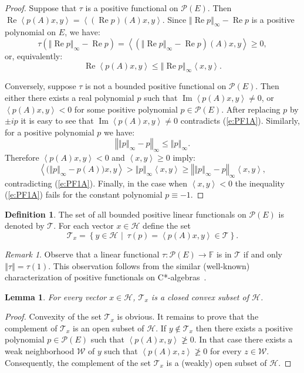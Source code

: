 \documentclass{tran-l}
\newtheorem{lem}[thm]{Lemma}
\theoremstyle{definition}
\newtheorem{defn}[thm]{Definition}
\theoremstyle{remark}
\newtheorem{rem}[thm]{Remark}
\numberwithin{equation}{subsection}
\DeclareMathOperator{\RE}{Re}
\DeclareMathOperator{\IM}{Im}
\newcommand{\h}{\mathcal{H}}
\newcommand{\W}{\mathcal{W}}
\newcommand{\Field}{\mathbb{F}}
\newcommand{\Poly}{\mathcal{P}(E)}
\newcommand{\States}{\mathcal{T}}
\newcommand{\set}[1]{\left\{#1\right\}}
\newcommand{\seq}[1]{\left<#1\right>}
\newcommand{\norm}[1]{\left\Vert#1\right\Vert}
\begin{document}
\begin{proof}
Suppose that $\tau$ is a positive functional on $\Poly$. Then $\RE \seq{p(A)x,y} = \seq{(\RE p)(A)x,y}$. Since $\norm{\RE p}_\infty - \RE p$ is a positive polynomial on $E$, we have:
\[ \tau(\norm{\RE p}_\infty - \RE p) =
   \seq{(\norm{\RE p}_\infty - \RE p)(A)x, y} \geq 0, \]
or, equivalently:
\[ \RE\seq{p(A)x,y} \leq \norm{\RE p}_\infty\seq{x,y}. \]

Conversely, suppose $\tau$ is not a bounded positive functional on $\Poly$. Then either there exists a real polynomial $p$ such that $\IM\seq{p(A)x,y}\neq0$, or $\seq{p(A)x,y}<0$ for some positive polynomial $p\in\Poly$. After replacing $p$ by $\pm{i}{p}$ it is easy to see that $\IM\seq{p(A)x,y}\neq0$ contradicts (\ref{e:PF1A}). Similarly, for a positive polynomial $p$ we have:
\[ \norm{\norm{p}_\infty-p}_\infty \leq \norm{p}_\infty. \]
Therefore $\seq{p(A)x,y}<0$ and $\seq{x,y}\geq0$ imply:
\[ \seq{ \big(\norm{p}_\infty-p(A)\big)x,y} > \norm{p}_\infty\seq{x,y}
   \geq \norm{\norm{p}_\infty-p}_\infty\seq{x,y}, \]
contradicting (\ref{e:PF1A}). Finally, in the case when $\seq{x,y}<0$ the inequality (\ref{e:PF1A}) fails for the constant polynomial $p\equiv-1$.
\end{proof}

\begin{defn}
The set of all bounded positive linear functionals on $\Poly$ is denoted by $\States$. For each vector $x\in\h$ define the set
\[ \States_x = \set{y\in\h\,\,|\,\,\,
   \tau(p) = \seq{p(A)x,y} \in \States} . \]
\end{defn}

\begin{rem}
Observe that a linear functional $\tau\colon\Poly\to\Field$ is in $\States$ if and only $\norm{\tau}=\tau(1)$. This observation follows from the similar (well-known) characterization of positive functionals on C*-algebras~\cite{KR83}.
\end{rem}

\begin{lem} \label{l:PF3}
For every vector $x\in\h$, $\States_x$ is a closed convex subset of $\h$.
\end{lem}

\begin{proof}
Convexity of the set $\States_x$ is obvious. It remains to prove that the complement of $\States_x$ is an open subset of $\h$. If $y\not\in\States_x$ then there exists a positive polynomial $p\in\Poly$ such that $\seq{p(A)x, y} \not\geq 0$. In that case there exists a weak neighborhood $\W$ of $y$ such that $\seq{p(A)x,z}\not\geq0$ for every $z\in\W$. Consequently, the complement of the set $\States_x$ is a (weakly) open subset of $\h$.
\end{proof}
\end{document}
